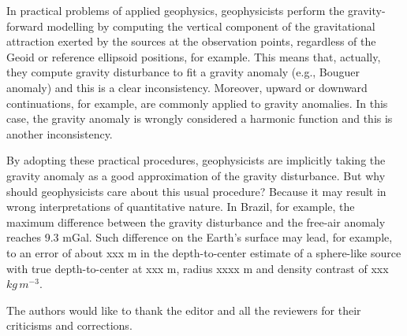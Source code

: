 \documentclass[extra]{gji}
\begin{document}
In practical problems of applied geophysics, geophysicists perform the
gravity-forward modelling by computing the vertical component of the
gravitational attraction exerted by the sources at the observation
points, regardless of the Geoid or reference ellipsoid positions,
for example.
This means that, actually, they compute gravity disturbance to fit
a gravity anomaly (e.g., Bouguer anomaly) and this is a clear inconsistency.
Moreover, upward or downward continuations, for example, are commonly applied to
gravity anomalies. In this case, the gravity anomaly is wrongly considered a
harmonic function and this is another inconsistency.

By adopting these practical procedures, geophysicists are implicitly
taking the gravity anomaly as a good approximation of the gravity
disturbance. But why should geophysicists care about this usual
procedure? Because it may result in wrong interpretations of
quantitative nature. In Brazil, for example, the maximum difference
between the gravity disturbance and the free-air anomaly reaches 9.3
mGal. Such difference on the Earth's surface may lead, for example, to
an error of about xxx m in the depth-to-center estimate of a sphere-like
source with true depth-to-center at xxx m, radius xxxx m and density
contrast of xxx $kg \, m^{-3}$.


\begin{acknowledgments}
The authors would like to thank the editor and all the
reviewers for their criticisms and corrections.
\end{acknowledgments}





\appendix
%
%
%
%
\end{document}
